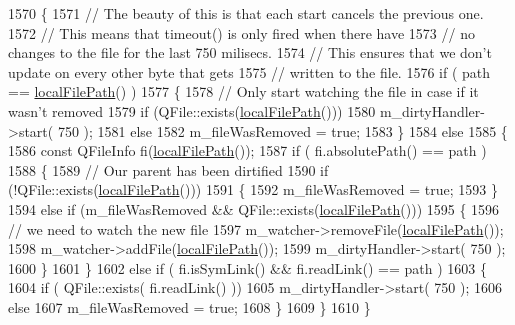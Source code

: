 \begin{DoxyCode}
1570 \{
1571     \textcolor{comment}{// The beauty of this is that each start cancels the previous one.}
1572     \textcolor{comment}{// This means that timeout() is only fired when there have}
1573     \textcolor{comment}{// no changes to the file for the last 750 milisecs.}
1574     \textcolor{comment}{// This ensures that we don't update on every other byte that gets}
1575     \textcolor{comment}{// written to the file.}
1576     \textcolor{keywordflow}{if} ( path == \hyperlink{classKParts_1_1ReadOnlyPart_a9c411f8471de1a852c8595719d179946}{localFilePath}() )
1577     \{
1578         \textcolor{comment}{// Only start watching the file in case if it wasn't removed}
1579         \textcolor{keywordflow}{if} (QFile::exists(\hyperlink{classKParts_1_1ReadOnlyPart_a9c411f8471de1a852c8595719d179946}{localFilePath}()))
1580             m\_dirtyHandler->start( 750 );
1581         \textcolor{keywordflow}{else}
1582             m\_fileWasRemoved = \textcolor{keyword}{true};
1583     \}
1584     \textcolor{keywordflow}{else}
1585     \{
1586         \textcolor{keyword}{const} QFileInfo fi(\hyperlink{classKParts_1_1ReadOnlyPart_a9c411f8471de1a852c8595719d179946}{localFilePath}());
1587         \textcolor{keywordflow}{if} ( fi.absolutePath() == path )
1588         \{
1589             \textcolor{comment}{// Our parent has been dirtified}
1590             \textcolor{keywordflow}{if} (!QFile::exists(\hyperlink{classKParts_1_1ReadOnlyPart_a9c411f8471de1a852c8595719d179946}{localFilePath}()))
1591             \{
1592                 m\_fileWasRemoved = \textcolor{keyword}{true};
1593             \}
1594             \textcolor{keywordflow}{else} \textcolor{keywordflow}{if} (m\_fileWasRemoved && QFile::exists(\hyperlink{classKParts_1_1ReadOnlyPart_a9c411f8471de1a852c8595719d179946}{localFilePath}()))
1595             \{
1596                 \textcolor{comment}{// we need to watch the new file}
1597                 m\_watcher->removeFile(\hyperlink{classKParts_1_1ReadOnlyPart_a9c411f8471de1a852c8595719d179946}{localFilePath}());
1598                 m\_watcher->addFile(\hyperlink{classKParts_1_1ReadOnlyPart_a9c411f8471de1a852c8595719d179946}{localFilePath}());
1599                 m\_dirtyHandler->start( 750 );
1600             \}
1601         \}
1602         \textcolor{keywordflow}{else} \textcolor{keywordflow}{if} ( fi.isSymLink() && fi.readLink() == path )
1603         \{
1604             \textcolor{keywordflow}{if} ( QFile::exists( fi.readLink() ))
1605                 m\_dirtyHandler->start( 750 );
1606             \textcolor{keywordflow}{else}
1607                 m\_fileWasRemoved = \textcolor{keyword}{true};
1608         \}
1609     \}
1610 \}
\end{DoxyCode}
